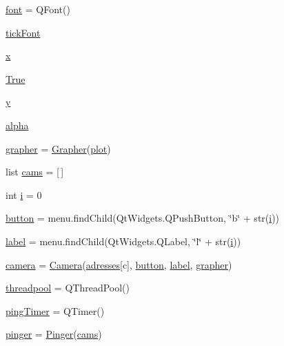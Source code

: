 \begin{DoxyCompactItemize}
\hyperlink{namespaceui_a30ed37eb10260adbcf97ae9f39bc5f8e}{font} = Q\+Font()
\item 
\hyperlink{namespaceui_a7a1d55977d90414ac9a33a4b2042ef52}{tick\+Font}
\item 
\hyperlink{namespaceui_a0031c57aa0841c20af5e52dc5634d026}{x}
\item 
\hyperlink{namespaceui_af8762a8410b6abe7b673bc2c8ef05784}{True}
\item 
\hyperlink{namespaceui_a21b97caebd553671413aa6d515e9a6dd}{y}
\item 
\hyperlink{namespaceui_adc51f403edb0c2ba24343024b93644b0}{alpha}
\item 
\hyperlink{namespaceui_a93ae6b16cc6a8252e4bf5a5d2ed94aa6}{grapher} = \hyperlink{classui_1_1_grapher}{Grapher}(\hyperlink{namespaceui_a45f8c2fae5eb64cd2de3091bd3fc3ca8}{plot})
\item 
list \hyperlink{namespaceui_a8e2392b67718029c7ae06c8e4f79b9dc}{cams} = \mbox{[}$\,$\mbox{]}
\item 
int \hyperlink{namespaceui_a864c62b3f0bd6745e0d18d87e70defe6}{i} = 0
\item 
\hyperlink{namespaceui_af6332480b18dc17e84cc4045f3330aac}{button} = menu.\+find\+Child(Qt\+Widgets.\+Q\+Push\+Button, \char`\"{}b\char`\"{} + str(\hyperlink{namespaceui_a864c62b3f0bd6745e0d18d87e70defe6}{i}))
\item 
\hyperlink{namespaceui_affd9697385ba4bf6c290a661c5a9b6cd}{label} = menu.\+find\+Child(Qt\+Widgets.\+Q\+Label, \char`\"{}l\char`\"{} + str(\hyperlink{namespaceui_a864c62b3f0bd6745e0d18d87e70defe6}{i}))
\item 
\hyperlink{namespaceui_afb37972e0352b1558875ce89d7fdc0ad}{camera} = \hyperlink{classui_1_1_camera}{Camera}(\hyperlink{namespaceui_aad45a9db615017fdd003dcd9e271a9b9}{adresses}\mbox{[}c\mbox{]}, \hyperlink{namespaceui_af6332480b18dc17e84cc4045f3330aac}{button}, \hyperlink{namespaceui_affd9697385ba4bf6c290a661c5a9b6cd}{label}, \hyperlink{namespaceui_a93ae6b16cc6a8252e4bf5a5d2ed94aa6}{grapher})
\item 
\hyperlink{namespaceui_af1457bf15aa8152a54da34956fe19382}{threadpool} = Q\+Thread\+Pool()
\item 
\hyperlink{namespaceui_a413340b69ea8a36f526ef691e1287f2c}{ping\+Timer} = Q\+Timer()
\item 
\hyperlink{namespaceui_ad6a1f0cb59203283f1891267696aaf6e}{pinger} = \hyperlink{classui_1_1_pinger}{Pinger}(\hyperlink{namespaceui_a8e2392b67718029c7ae06c8e4f79b9dc}{cams})
\end{DoxyCompactItemize}


